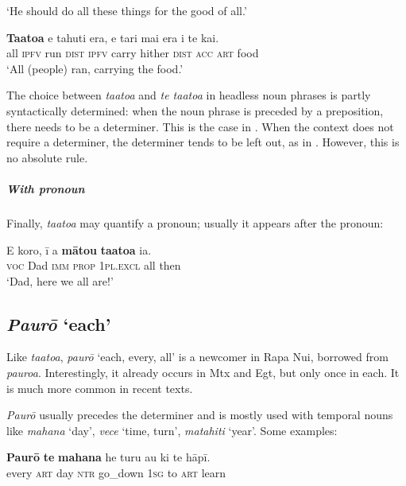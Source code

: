 \glt 
‘He should do all these things for the good of all.’ \textstyleExampleref{[R647.043]} 
\z

\ea\label{ex:4.57}
\gll \textbf{Ta{\ꞌ}ato{\ꞌ}a} e tahuti era, e tari mai era i te kai. \\
all \textsc{ipfv} run \textsc{dist} \textsc{ipfv} carry hither \textsc{dist} \textsc{acc} \textsc{art} food \\

\glt
‘All (people) ran, carrying the food.’ \textstyleExampleref{[R210.155]} 
\z

The choice between \textit{ta{\ꞌ}ato{\ꞌ}a} and \textit{te ta{\ꞌ}ato{\ꞌ}a} in headless noun phrases is partly syntactically determined: when the noun phrase is preceded by a preposition, there needs to be a determiner. This is the case in . When the context does not require a determiner, the determiner tends to be left out, as in . However, this is no absolute rule. 

\subparagraph{With pronoun} Finally, \textit{ta{\ꞌ}ato{\ꞌ}a} may quantify a pronoun; usually it appears after the pronoun:

\ea\label{ex:4.58}
\gll E koro, {\ꞌ}ī a \textbf{mātou} \textbf{ta{\ꞌ}ato{\ꞌ}a} ia. \\
\textsc{voc} Dad \textsc{imm} \textsc{prop} \textsc{1pl.excl} all then \\

\glt 
‘Dad, here we all are!’ \textstyleExampleref{[R237.051]} 
\z
{}
\subsection{\textit{Paurō} ‘each’}\label{sec:4.4.3}
Like \textit{ta{\ꞌ}ato{\ꞌ}a}, \textit{paurō} ‘each, every, all’ is a newcomer in Rapa Nui, borrowed from  \textit{pauroa}. Interestingly, it already occurs in Mtx and Egt, but only once in each. It is much more common in recent texts.

\textit{Paurō} usually precedes the determiner and is mostly used with temporal nouns like \textit{mahana} ‘day’, \textit{vece} ‘time, turn’, \textit{matahiti} ‘year’. Some examples:

\ea\label{ex:4.59}
\gll \textbf{Paurō} \textbf{te} \textbf{mahana} he turu au ki te hāpī. \\
every \textsc{art} day \textsc{ntr} go\_down \textsc{1sg} to \textsc{art} learn \\

